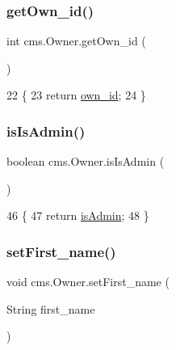 \subsubsection{\texorpdfstring{get\+Own\+\_\+id()}{getOwn\_id()}}
{\footnotesize\ttfamily int cms.\+Owner.\+get\+Own\+\_\+id (\begin{DoxyParamCaption}{ }\end{DoxyParamCaption})\hspace{0.3cm}{\ttfamily [inline]}}


\begin{DoxyCode}
22                            \{
23         \textcolor{keywordflow}{return} \mbox{\hyperlink{classcms_1_1_owner_ae84bad6a2ff834a9f2b3fe6ea23c7192}{own\_id}};
24     \}
\end{DoxyCode}
\mbox{\label{classcms_1_1_owner_ad7a506aa6c280629b6f5eeaa84aab1bd}} 
\subsubsection{\texorpdfstring{is\+Is\+Admin()}{isIsAdmin()}}
{\footnotesize\ttfamily boolean cms.\+Owner.\+is\+Is\+Admin (\begin{DoxyParamCaption}{ }\end{DoxyParamCaption})\hspace{0.3cm}{\ttfamily [inline]}}


\begin{DoxyCode}
46                                \{
47         \textcolor{keywordflow}{return} \mbox{\hyperlink{classcms_1_1_owner_a0437c5a1a3071521a64846b09c0c6f7e}{isAdmin}};
48     \}
\end{DoxyCode}
\mbox{\label{classcms_1_1_owner_ab78b9ff6d0cd42b630552d2c3019f0fc}} 
\subsubsection{\texorpdfstring{set\+First\+\_\+name()}{setFirst\_name()}}
{\footnotesize\ttfamily void cms.\+Owner.\+set\+First\+\_\+name (\begin{DoxyParamCaption}\item[{String}]{first\+\_\+name }\end{DoxyParamCaption})\hspace{0.3cm}{\ttfamily [inline]}}


